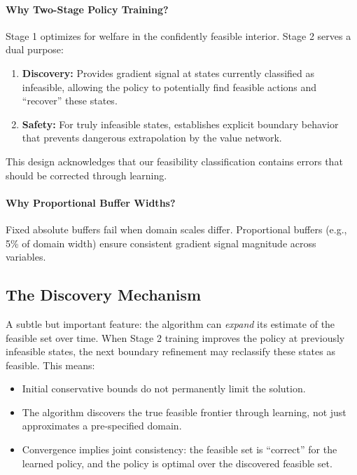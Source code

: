 \paragraph{Why Two-Stage Policy Training?}
Stage 1 optimizes for welfare in the confidently feasible interior. Stage 2 serves a dual purpose:
\begin{enumerate}
    \item \textbf{Discovery:} Provides gradient signal at states currently classified as infeasible, allowing the policy to potentially find feasible actions and ``recover'' these states.
    \item \textbf{Safety:} For truly infeasible states, establishes explicit boundary behavior that prevents dangerous extrapolation by the value network.
\end{enumerate}
This design acknowledges that our feasibility classification contains errors that should be corrected through learning.

\paragraph{Why Proportional Buffer Widths?}
Fixed absolute buffers fail when domain scales differ. Proportional buffers (e.g., 5\% of domain width) ensure consistent gradient signal magnitude across variables.

\subsection{The Discovery Mechanism}
A subtle but important feature: the algorithm can \textit{expand} its estimate of the feasible set over time. When Stage 2 training improves the policy at previously infeasible states, the next boundary refinement may reclassify these states as feasible. This means:
\begin{itemize}
    \item Initial conservative bounds do not permanently limit the solution.
    \item The algorithm discovers the true feasible frontier through learning, not just approximates a pre-specified domain.
    \item Convergence implies joint consistency: the feasible set is ``correct'' for the learned policy, and the policy is optimal over the discovered feasible set.
\end{itemize}

